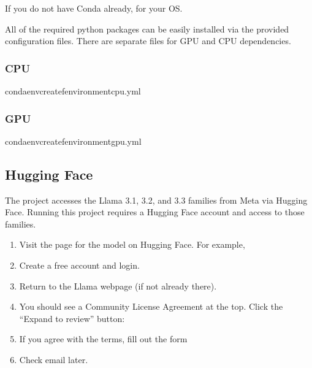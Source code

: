 \documentclass[letterpaper,10pt,english]{sphinxmanual}
\begin{document}
\sphinxAtStartPar
If you do not have Conda already,  for your OS.

\sphinxAtStartPar
All of the required python packages can be easily installed via the provided configuration files. There are separate files for GPU and CPU dependencies.


\subsubsection{CPU}
\label{\detokenize{usage:cpu}}
\begin{sphinxVerbatim}[commandchars=\\\{\}]
 condaenvcreate\PYGZhy{}fenvironment\PYGZus{}cpu.yml
\end{sphinxVerbatim}


\subsubsection{GPU}
\label{\detokenize{usage:gpu}}
\begin{sphinxVerbatim}[commandchars=\\\{\}]
 condaenvcreate\PYGZhy{}fenvironment\PYGZus{}gpu.yml
\end{sphinxVerbatim}


\subsection{Hugging Face}
\label{\detokenize{usage:hugging-face}}
\sphinxAtStartPar
The project accesses the Llama 3.1, 3.2, and 3.3 families from Meta via Hugging Face. Running this project requires a Hugging Face account and access to those families.
\begin{enumerate}
%
\item {} 
\sphinxAtStartPar
Visit the page for the model on Hugging Face. For example, 

\item {} 
\sphinxAtStartPar
Create a free account and login.

\item {} 
\sphinxAtStartPar
Return to the Llama webpage (if not already there).

\item {} 
\sphinxAtStartPar
You should see a Community License Agreement at the top. Click the “Expand to review” button:

\item {} 
\sphinxAtStartPar
If you agree with the terms, fill out the form

\item {} 
\sphinxAtStartPar
Check email later.

\end{enumerate}
\end{document}
